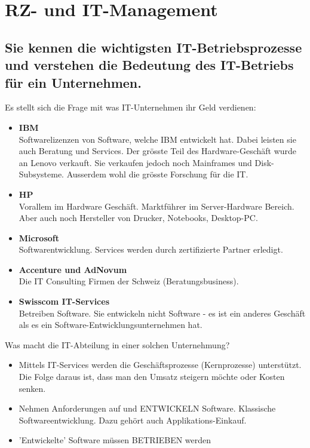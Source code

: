 \chapter{RZ- und IT-Management}

\section{Sie kennen die wichtigsten IT-Betriebsprozesse und
	verstehen die Bedeutung des IT-Betriebs für ein
	Unternehmen.}

Es stellt sich die Frage mit was IT-Unternehmen ihr Geld verdienen:
\begin{itemize}
	\item \textbf{IBM}\\
	Softwarelizenzen von Software, welche IBM entwickelt hat. Dabei leisten sie auch Beratung und Services. Der grösste Teil
	des Hardware-Geschäft wurde an Lenovo verkauft. Sie verkaufen jedoch noch Mainframes und Disk-Subsysteme. Ausserdem
	wohl die grösste Forschung für die IT.
	\item \textbf{HP}\\
	Vorallem im Hardware Geschäft. Marktführer im Server-Hardware Bereich. Aber auch noch Hersteller von Drucker, Notebooks,
	Desktop-PC.
	\item \textbf{Microsoft}\\
	Softwarentwicklung. Services werden durch zertifizierte Partner erledigt.
	\item \textbf{Accenture und AdNovum}\\
	Die IT Consulting Firmen der Schweiz (Beratungsbusiness).
	\item \textbf{Swisscom IT-Services}\\
	Betreiben Software. Sie entwickeln nicht Software - es ist ein anderes Geschäft als es ein Software-Entwicklungsunternehmen hat.
\end{itemize}

Was macht die IT-Abteilung in einer solchen Unternehmung?
\begin{itemize}
	\item Mittels IT-Services werden die Geschäftsprozesse (Kernprozesse) unterstützt. Die Folge daraus ist, dass man den Umsatz steigern möchte oder Kosten senken.
	\item Nehmen Anforderungen auf und ENTWICKELN Software. Klassische Softwareentwicklung. Dazu gehört auch Applikations-Einkauf.
	\item 'Entwickelte' Software müssen BETRIEBEN werden
\end{itemize}

